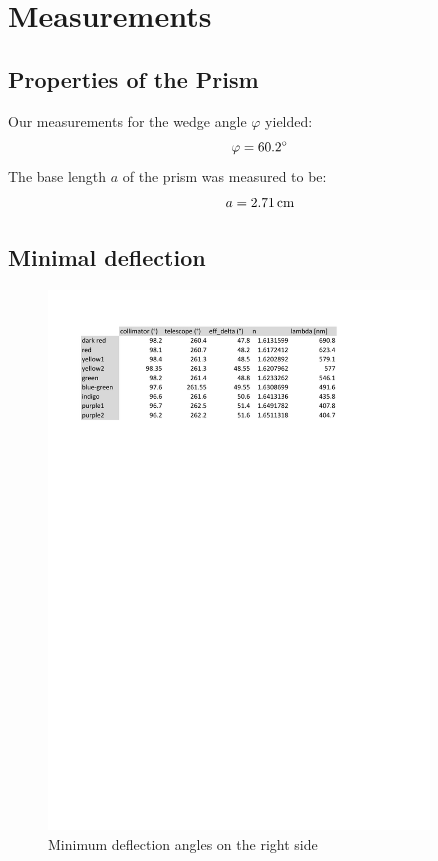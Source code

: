 \documentclass{scrreprt}
\newcommand{\unit}[1]{\ensuremath{\, \mathrm{#1}}}
\renewcommand{\phi}{\varphi}
\begin{document}
\section{Measurements}

\subsection{Properties of the Prism}
Our measurements for the wedge angle $\phi$ yielded:
\begin{equation}
\notag
	\phi = \ang{60.2}
\end{equation}
The base length $a$ of the prism was measured to be:
\begin{equation}
\notag
	a = 2.71 \unit{cm}
\end{equation} 
\subsection{Minimal deflection}
\begin{figure}[H]
	\centering
  \includegraphics[width=0.9\textwidth]{diag/right.pdf}
	\caption{Minimum deflection angles on the right side}
	\label{fig:right}
\end{figure}
\end{document}
